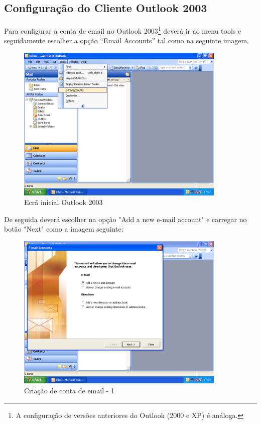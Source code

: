 \subsection{Configuração do Cliente Outlook 2003}

Para configurar a conta de email no Outlook 2003\footnote{A configuração de versões anteriores do Outlook (2000 e XP) é análoga.} deverá ir ao menu tools e seguidamente escolher a opção ``Email Accounts'' tal como na seguinte imagem.

\begin{figure}[H]
    \begin{center}
        \includegraphics[width=10cm]{include/img/outlook2003_1}
    \end{center}
    \caption{Ecrã inicial Outlook 2003}
    \label{fig:OUTLK2k31}
\end{figure}

De seguida deverá escolher na opção "Add a new e-mail account" e carregar no botão "Next" como a imagem seguinte:

\begin{figure}[H]
    \begin{center}
        \includegraphics[width=10cm]{include/img/outlook2003_2}
    \end{center}
    \caption{Criação de conta de email - 1}
    \label{fig:OUTLK2k32}
\end{figure}

